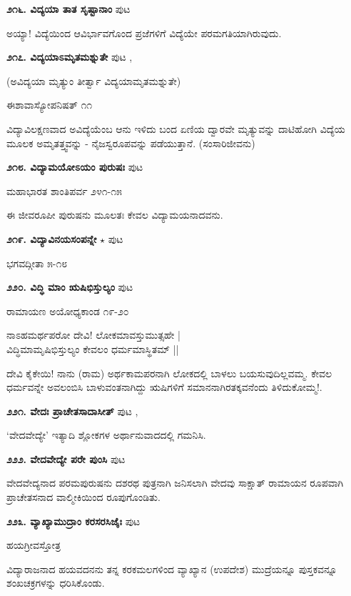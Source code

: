 \medskip
\noindent\textbf{೨೧೬. ವಿದ್ಯಯಾ ತಾತ ಸೃಷ್ಟಾನಾಂ} \hfill ಪುಟ \pageref{133}

ಅಯ್ಯಾ! ವಿದ್ಯೆಯಿಂದ ಆವಿರ್ಭಾವಗೊಂದ ಪ್ರಜೆಗಳಿಗೆ ವಿದ್ಯೆಯೇ ಪರಮಗತಿಯಾಗಿರುವುದು.

\medskip
\noindent\textbf{೨೧೭. ವಿದ್ಯಯಾಽಮೃತಮಶ್ನುತೇ} \hfill ಪುಟ \pageref{99},\pageref{133}

(ಅವಿದ್ಯಯಾ ಮೃತ್ಯುಂ ತೀರ್ತ್ವಾ ವಿದ್ಯಯಾಮೃತಮಶ್ನುತೇ)

\hfill ಈಶಾವಾಸ್ಯೋಪನಿಷತ್ ೧೧

ವಿದ್ಯಾವಿಲಕ್ಷಣವಾದ ಅವಿದ್ಯೆಯೆಂಬ ಆನು ಇಳಿದು ಬಂದ ಏಣಿಯ ದ್ವಾರವೇ ಮೃತ್ಯುವನ್ನು ದಾಟಿಹೋಗಿ ವಿದ್ಯೆಯ ಮೂಲಕ ಅಮೃತತ್ತ್ವವನ್ನು - ನೈಜಸ್ವರೂಪವನ್ನು ಪಡೆಯುತ್ತಾನೆ. (ಸಂಸಾರಿಜೀವನು)

\medskip
\noindent\textbf{೨೧೮. ವಿದ್ಯಾಮಯೋಽಯಂ ಪುರುಷಃ} \hfill ಪುಟ \pageref{133}

\hfill ಮಹಾಭಾರತ ಶಾಂತಿಪರ್ವ ೨೪೧-೧೫

ಈ ಜೀವರೂಪೀ ಪುರುಷನು ಮೂಲತಃ ಕೇವಲ ವಿದ್ಯಾಮಯನಾದವನು.

\medskip
\noindent\textbf{೨೧೯. ವಿದ್ಯಾವಿನಯಸಂಪನ್ನೇ} $\star$ \hfill ಪುಟ \pageref{67}

\hfill ಭಗವದ್ಗೀತಾ ೫-೧೮

\medskip
\noindent\textbf{೨೨೦. ವಿದ್ಧಿ ಮಾಂ ಋಷಿಭಿಸ್ತುಲ್ಯಂ} \hfill ಪುಟ \pageref{151}

\hfill ರಾಮಾಯಣ ಅಯೋಧ್ಯಕಾಂಡ ೧೯-೨೦

\begin{shloka}
ನಾಽಹಮರ್ಥಪರೋ ದೇವಿ! ಲೋಕಮಾವಸ್ತುಮುತ್ಸಹೇ |\\
ವಿದ್ಧಿಮಾಮೃಷಿಭಿಸ್ತುಲ್ಯಂ ಕೇವಲಂ ಧರ್ಮಮಾಸ್ಥಿತಮ್ ||
\end{shloka}

ದೇವಿ ಕೈಕೇಯಿ! ನಾನು (ರಾಮ) ಅರ್ಥಕಾಮಪರನಾಗಿ ಲೋಕದಲ್ಲಿ ಬಾಳಲು ಬಯಸುವುದಿಲ್ಲವಮ್ಮ. ಕೇವಲ ಧರ್ಮವನ್ನೇ ಅವಲಂಬಿಸಿ ಬಾಳುವಂತನಾಗಿದ್ದು ಋಷಿಗಳಿಗೆ ಸಮಾನನಾಗಿರತಕ್ಕವನೆಂದು ತಿಳಿದುಕೋಮ್ಮ!.

\medskip
\noindent\textbf{೨೨೧. ವೇದಃ ಪ್ರಾಚೇತಸಾದಾಸೀತ್} \hfill ಪುಟ \pageref{228},\pageref{232}

`ವೇದವೇದ್ಯೇ' ಇತ್ಯಾದಿ ಶ್ಲೋಕಗಳ ಅರ್ಥಾನುವಾದದಲ್ಲಿ ಗಮನಿಸಿ.

\medskip
\noindent\textbf{೨೨೨. ವೇದವೇದ್ಯೇ ಪರೇ ಪುಂಸಿ} \hfill ಪುಟ \pageref{168}

ವೇದವೇದ್ಯನಾದ ಪರಮಪುರುಷನು ದಶರಥ ಪುತ್ರನಾಗಿ ಜನಿಸಲಾಗಿ ವೇದವು ಸಾಕ್ಷಾತ್ ರಾಮಾಯನ ರೂಪವಾಗಿ ಪ್ರಾಚೇತಸನಾದ ವಾಲ್ಮೀಕಿಯಿಂದ ರೂಪುಗೊಂಡಿತು.

\medskip
\noindent\textbf{೨೨೩. ವ್ಯಾಖ್ಯಾಮುದ್ರಾಂ ಕರಸರಸಿಜೈಃ} \hfill ಪುಟ \pageref{100}

\hfill ಹಯಗ್ರೀವಸ್ತೋತ್ರ

ವಿದ್ಯಾರಾಜನಾದ ಹಯವದನನು ತನ್ನ ಕರಕಮಲಗಳಿಂದ ವ್ಯಾಖ್ಯಾನ (ಉಪದೇಶ) ಮುದ್ರೆಯನ್ನೂ ಪುಸ್ತಕವನ್ನೂ ಶಂಖಚಕ್ರಗಳನ್ನು ಧರಿಸಿಕೊಂಡು.
 
